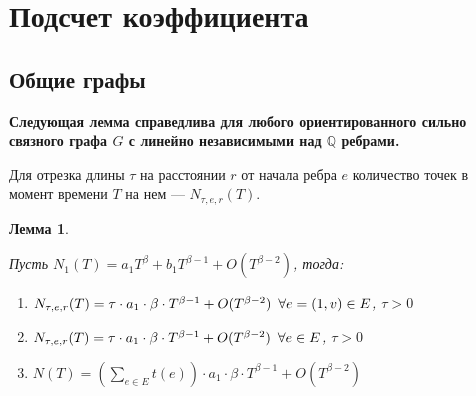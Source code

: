 \documentclass{article}
\newcommand{\squad}{
    \hspace{0.5em}
}
\newtheorem{lemma}{Лемма}
\begin{document}
\pagebreak

\section{Подсчет коэффициента}

\subsection{Общие графы}

\textbf{Следующая лемма справедлива для любого ориентированного сильно связного графа $G$ с линейно независимыми над $\mathbb{Q}$ ребрами.}

Для отрезка длины $\tau$ на расстоянии $r$ от начала ребра $e$ количество точек в момент времени $T$ на нем --- $N_{\tau, e, r}(T)$.

\begin{lemma} $ $

\label{pg}
Пусть $N_{1}(T) = a_{1}T^{\beta} + b_{1}T^{\beta - 1} + O(T^{\beta - 2})$, тогда:
\begin{enumerate} 
    \item $N_{\tau, e, r}(T) = \tau \cdot a_{1} \cdot \beta \cdot T^{\beta - 1} + O(T^{\beta - 2}) \squad \forall e = (1, v) \in E$, $\tau > 0$
    \item $N_{\tau, e, r}(T) = \tau \cdot a_{1} \cdot \beta \cdot T^{\beta - 1} + O(T^{\beta - 2}) \squad \forall e \in E$, $\tau > 0$
    \item $N(T) = \left(\sum_{e \in E}{t(e)}\right) \cdot a_{1} \cdot \beta \cdot T^{\beta - 1} + O(T^{\beta - 2})$
\end{enumerate}
\end{lemma} 
\end{document}
